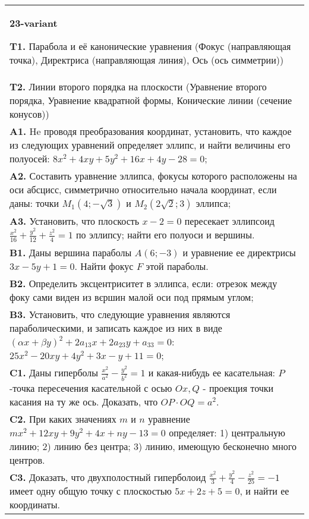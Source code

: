 \documentclass{article}
\begin{document}
\begin{tabular}{m{17cm}}
\textbf{23-variant}
\newline

\textbf{T1.} Парабола и её канонические уравнения (Фокус (направляющая точка), Директриса (направляющая линия), Ось (ось симметрии)) \\
\textbf{T2.} Линии второго порядка на плоскости (Уравнение второго порядка, Уравнение квадратной формы, Конические линии (сечение конусов)) \\
\textbf{A1.} He проводя преобразования координат, установить, что каждое из следующих уравнений определяет эллипс, и найти величины его полуосей: $8 x^2+4 x y+5 y^2+16 x+4 y-28=0$; \\
\textbf{A2.} Составить уравнение эллипса, фокусы которого расположены на оси абсцисс, симметрично относительно начала координат, если даны: точки $M_1(4 ;-\sqrt{3})$ и $M_2(2 \sqrt{2} ; 3)$ эллипса; \\
\textbf{A3.} Установить, что плоскость $x-2=0$ пересекает эллипсоид $\frac{x^2}{16}+\frac{y^2}{12}+\frac{z^2}{4}=1$ по эллипсу; найти его полуоси и вершины. \\
\textbf{B1.} Даны вершина параболы $A(6 ;-3)$ и уравнение ее директрисы $3 x-5 y+1=0$. Найти фокус $F$ этой параболы. \\
\textbf{B2.} Определить эксцентриситет в эллипса, если: отрезок между фоку сами виден из вєршин малой оси под прямым углом; \\
\textbf{B3.} Установить, что следующие уравнения являются параболическими, и записать каждое из них в виде $(\alpha x+\beta y)^2+2 a_{13} x+2 a_{23} y+a_{33}=0$: $25 x^2-20 x y+4 y^2+3 x-y+11=0$; \\
\textbf{C1.} Даны гиперболы $\frac{x^2}{a^2}-\frac{y^2}{b^2}=1$ и какая-нибудь ее касательная: $P$-точка пересечения касательной с осью $O x, Q$ - проекция точки касания на ту же ось. Доказать, что $O P \cdot O Q=a^2$. \\
\textbf{C2.} При каких значениях $m$ и $n$ уравнение $m x^2+12 x y+9 y^2+4 x+n y-13=0$ определяет: 1) центральную линию; 2) линию без центра; 3) линию, имеющую бесконечно много центров. \\
\textbf{C3.} Доказать, что двухполостный гиперболоид $\frac{x^2}{3}+\frac{y^2}{4}-\frac{z^2}{25}=-1$ имеет одну общую точку с плоскостью $5 x+2 z+5=0$, и найти ее координаты. \\

\end{tabular}
\vspace{1cm}
\end{document}
